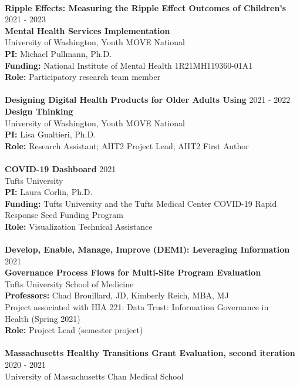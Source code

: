 \documentclass[a4paper,12pt]{article}
\begin{document}
{\\
\textbf{Ripple Effects: Measuring the Ripple Effect Outcomes of Children’s} \hfill 2021 - 2023 \\ \textbf{Mental Health Services Implementation} \\
University of Washington, Youth MOVE National\\
\textbf{PI:} Michael Pullmann, Ph.D.\\
\textbf{Funding:} National Institute of Mental Health 1R21MH119360-01A1\\
\textbf{Role:} Participatory research team member\\
\\
\textbf{Designing Digital Health Products for Older Adults Using} \hfill 2021 - 2022 \\ \textbf{Design Thinking} \\
University of Washington, Youth MOVE National\\
\textbf{PI:} Lisa Gualtieri, Ph.D.\\
\textbf{Role:} Research Assistant; AHT2 Project Lead; AHT2 First Author\\
\pagebreak 
\\
\textbf{COVID-19 Dashboard} \hfill 2021\\
Tufts University\\
\textbf{PI:} Laura Corlin, Ph.D.\\
\textbf{Funding:} Tufts University and the Tufts Medical Center COVID-19 Rapid Response Seed Funding Program\\
\textbf{Role:} Visualization Technical Assistance\\
\\
\textbf{Develop, Enable, Manage, Improve (DEMI): Leveraging Information} \hfill 2021\\ \textbf{Governance Process Flows for Multi-Site Program Evaluation} \\
Tufts University School of Medicine\\
\textbf{Professors:} Chad Brouillard, JD, Kimberly Reich, MBA, MJ\\
Project associated with HIA 221: Data Trust: Information Governance in \\Health (Spring 2021)\\
\textbf{Role:} Project Lead (semester project)\\
\\
\textbf{Massachusetts Healthy Transitions Grant Evaluation, second iteration} \hfill 2020 - 2021 \\
University of Massachusetts Chan Medical School \\
}
\end{document}

